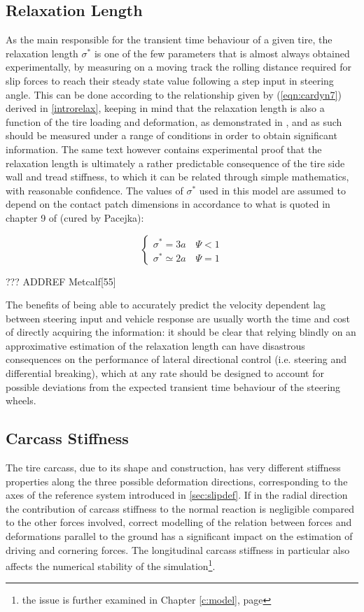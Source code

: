 \documentclass[12pt,a4paper]{report}
\newcommand{\eq}[2]{
\begin{equation} \label{#1}
#2
\end{equation}
}
\newcommand{\req}[1]{
(\ref{#1})
}
\begin{document}
 
\subsection{Relaxation Length} \label{sec:relax}
As the main responsible for the transient time behaviour of a given tire, the relaxation length $\sigma^*$ is one of the few parameters that is almost always obtained experimentally, by measuring on a moving track the rolling distance required for slip forces to reach their steady state value following a step input in steering angle.
This can be done according to the relationship given by \req{eqn:cardyn7} derived in \ref{introrelax}, keeping in mind that the relaxation length is also a function of the tire loading and deformation, as demonstrated in \citep{nhtsa}, and as such should be measured under a range of conditions in order to obtain significant information.
The same text however contains experimental proof that the relaxation length is ultimately a rather predictable consequence of the tire side wall and tread stiffness, to which it can be related through simple mathematics, with reasonable confidence.
The values of $\sigma^*$ used in this model are assumed to depend on the contact patch dimensions in accordance to what is quoted in chapter 9 of\citep{nhtsa} (cured by Pacejka):

\eq{eqn:relaxnum}{
\left\{
\begin{array}{l}
\sigma^* = 3a \quad \Psi < 1 \\
\sigma^* \simeq 2a \quad \Psi = 1
\end{array}
\right.
} 
??? ADDREF Metcalf[55]

The benefits of being able to accurately predict the velocity dependent lag between steering input and vehicle response are usually worth the time and cost of directly acquiring the information: it should be clear that relying blindly on an approximative estimation of the relaxation length can have disastrous consequences on the performance of lateral directional control (i.e. steering and differential breaking), which at any rate should be designed to account for possible deviations from the expected transient time behaviour of the steering wheels. %

\subsection{Carcass Stiffness} \label{sec:carstif}
The tire carcass, due to its shape and construction, has very different stiffness properties along the three possible deformation directions, corresponding to the axes of the reference system introduced in \ref{sec:slipdef}.
If in the radial direction the contribution of carcass stiffness to the normal reaction is negligible compared to the other forces involved, correct modelling of the relation between forces and deformations parallel to the ground has a significant impact on the estimation of driving and cornering forces. The longitudinal carcass stiffness in particular also affects the numerical stability of the simulation\footnote{the issue is further examined in Chapter \ref{c:model}, page \pageref{discrete}}.
\end{document}
